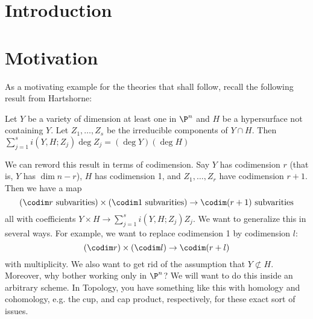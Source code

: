 
\newpage
\section{Introduction}



\section*{Motivation}

As a motivating example for the theories that shall follow, recall the following result from Hartshorne:

\begin{theorem*} [I.7.7]
Let $Y$ be a variety of dimension at least one in $\P^n$ and $H$ be a hypersurface not containing $Y$. Let $Z_1,\ldots,Z_s$ be the irreducible components of $Y \cap H$. Then $\displaystyle \sum_{j=1}^s i(Y, H; Z_j) \deg Z_j = (\deg Y)(\deg H)$
\end{theorem*}


We can reword this result in terms of codimension. Say $Y$ has codimension $r$ (that is, $Y$ has $\dim n-r$), $H$ has codimension 1, and $Z_1,\ldots,Z_r$ have codimension $r+1$. Then we have a map 
	\[
	(\codim r\text{ subvarities}) \times (\codim1\text{ subvarities}) \to \codim(r+1) \text{ subvarities}
	\]
all with coefficients $Y \times H \to \sum_{j=1}^s i(Y,H; Z_j) Z_j$. We want to generalize this in several ways. For example, we want to replace codimension 1 by codimension $l$:
	\[
	(\codim r) \times (\codim l) \to \codim (r+l)
	\]
with multiplicity. We also want to get rid of the assumption that $Y \not\subset H$. Moreover, why bother working only in $\P^n$? We will want to do this inside an arbitrary scheme. In Topology, you have something like this with homology and cohomology, e.g. the  cup, and cap product, respectively, for these exact sort of issues. 